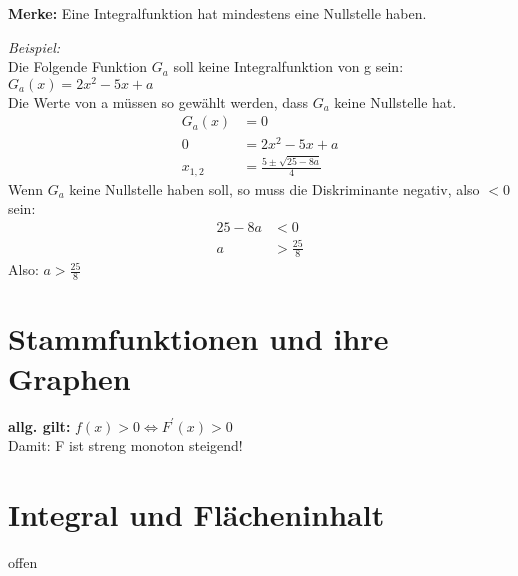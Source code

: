 \textbf{Merke:} Eine Integralfunktion hat mindestens eine Nullstelle haben.

\textit{Beispiel:} \\
Die Folgende Funktion $G_a$ soll keine Integralfunktion von g sein: $G_a(x)= 2x^2 -5x + a$\\
Die Werte von a müssen so gewählt werden, dass $G_a$ keine Nullstelle hat.
\begin{align*}
    G_a(x) &= 0 \\
    0 &= 2x^2 -5x + a \\
    x_{1,2} &= \frac{5 \pm \sqrt{25 - 8a}}{4} 
\end{align*}
Wenn $G_a$ keine Nullstelle haben soll, so muss die Diskriminante negativ, also $<0$ sein:
\begin{align*}
    25 - 8a &< 0 \\
    a &> \frac{25}{8}
\end{align*}
Also: $a> \frac{25}{8}$

\section{Stammfunktionen und ihre Graphen}

\textbf{allg. gilt:} $f(x) > 0 \Longleftrightarrow F^\prime(x) > 0$ \\
Damit: F ist streng monoton steigend!

\section{Integral und Flächeninhalt}

offen


